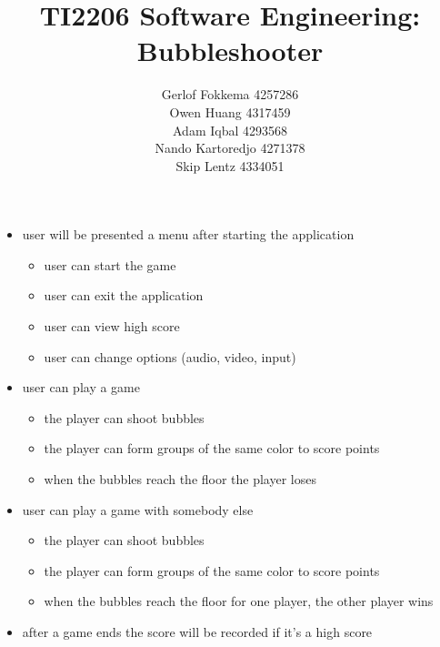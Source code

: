 \documentclass[a4paper,11pt]{article}
\title{TI2206 Software Engineering: Bubbleshooter}
\author{Gerlof Fokkema 4257286 \\
	Owen Huang 4317459 \\
	Adam Iqbal 4293568 \\
	Nando Kartoredjo 4271378 \\
	Skip Lentz 4334051 \\
}
\begin{document}
\maketitle

\newpage
\begin{itemize}
  \item user will be presented a menu after starting the application
  \begin{itemize}
    \item user can start the game
    \item user can exit the application
    \item user can view high score
    \item user can change options (audio, video, input)
  \end{itemize}
  \item user can play a game
  \begin{itemize}
    \item the player can shoot bubbles
    \item the player can form groups of the same color to score points
    \item when the bubbles reach the floor the player loses
  \end{itemize}
  \item user can play a game with somebody else
  \begin{itemize}
    \item the player can shoot bubbles
    \item the player can form groups of the same color to score points
    \item when the bubbles reach the floor for one player, the other player wins
  \end{itemize}
  \item after a game ends the score will be recorded if it's a high score
\end{itemize}
\end{document}
